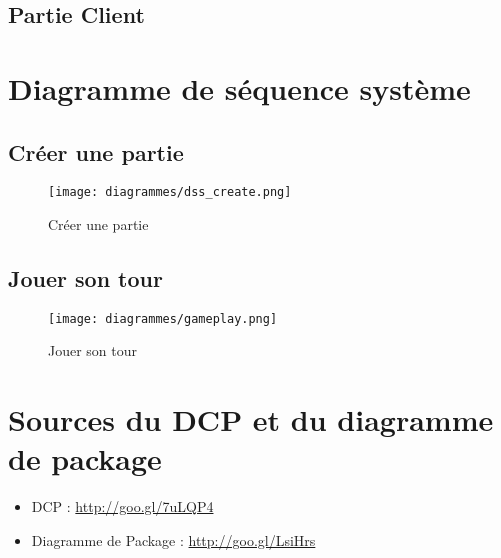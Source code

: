 	\subsection{Partie Client}

\section{Diagramme de séquence système}
	\subsection{Créer une partie}
		\vspace{10mm}
		\begin{figure}[H]
			\centering
			\texttt{[image: diagrammes/dss\_create.png]}
			\caption{Créer une partie}
		\end{figure}

	\subsection{Jouer son tour}
		\vspace{10mm}
		\begin{figure}[H]
			\centering
			\texttt{[image: diagrammes/gameplay.png]}
			\caption{Jouer son tour}
		\end{figure}
		\vspace{70mm}

\section{Sources du DCP et du diagramme de package}
	\begin{itemize}
		\item DCP : \url{http://goo.gl/7uLQP4}
		\item Diagramme de Package : \url{http://goo.gl/LsiHrs}
	\end{itemize}
